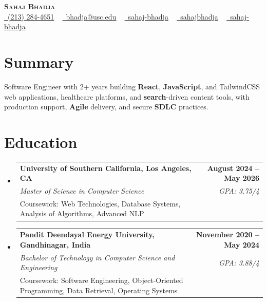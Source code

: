 \documentclass[letterpaper,10pt]{article}
\makeatletter
\newcommand{\sectionGap}{\vspace{-8pt}}
\newcommand{\resumeEduSubheading}[5]{\vspace{-1pt}\item\begin{tabular*}{1.0\textwidth}[t]{l@{\extracolsep{\fill}}r}\textbf{#1} & \textbf{\small #2} \\\textit{\small #3} & \textit{\small #4} \\\small #5 & \\\end{tabular*}\vspace{-4pt}}
\newcommand{\resumeSubHeadingListStart}{\begin{itemize}[leftmargin=0.0in, label={}]}
\newcommand{\resumeSubHeadingListEnd}{\end{itemize}}
\makeatother
\begin{document}
\begin{center}
{\Huge \scshape \textbf{Sahaj Bhadja}} \\ \vspace{1pt}
\small \href{tel:2132844651}{\faPhone\ \underline{(213) 284-4651}} ~ \href{mailto:bhadja@usc.edu}{\raisebox{-0.2\height}\faEnvelope\ \underline{bhadja@usc.edu}} ~
\href{https://www.linkedin.com/in/sahaj-bhadja/}{\raisebox{-0.2\height}\faLinkedin\ \underline{sahaj-bhadja}} ~ \href{https://github.com/SAHAJ-BHADJA}{\raisebox{-0.2\height}\faGithub\ \underline{sahajbhadja}} ~
\href{https://sahaj-bhadja.vercel.app/}{\raisebox{-0.2\height}\faGlobe\ \underline{sahaj-bhadja}}
\end{center}
\vspace{-16pt}
\section{Summary}
\begin{itemize}[leftmargin=0.15in, label={}]
\small{\item{Software Engineer with 2+ years building \textbf{React}, \textbf{JavaScript}, and TailwindCSS web applications, healthcare platforms, and \textbf{search}-driven content tools, with production support, \textbf{Agile} delivery, and secure \textbf{SDLC} practices.}}
\end{itemize}
\sectionGap
\section{Education}
\resumeSubHeadingListStart
\resumeEduSubheading{University of Southern California, Los Angeles, CA}{August 2024 -- May 2026}{Master of Science in Computer Science}{GPA: 3.75/4}{Coursework: Web Technologies, Database Systems, Analysis of Algorithms, Advanced NLP}
\resumeEduSubheading{Pandit Deendayal Energy University, Gandhinagar, India}{November 2020 -- May 2024}{Bachelor of Technology in Computer Science and Engineering}{GPA: 3.88/4}{Coursework: Software Engineering, Object-Oriented Programming, Data Retrieval, Operating Systems}
\resumeSubHeadingListEnd
\sectionGap
\end{document}
